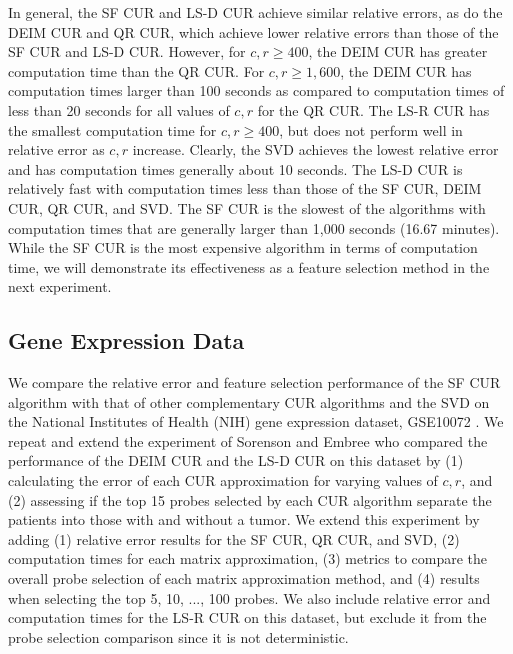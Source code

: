 \documentclass[12pt]{article}
\begin{document}
In general, the SF CUR and LS-D CUR achieve similar relative errors, as do the DEIM CUR and QR CUR, which achieve lower relative errors than those of the SF CUR and LS-D CUR.  However, for $c,r \geq 400$, the DEIM CUR has greater computation time than the QR CUR.  For $c,r \geq 1,600$, the DEIM CUR has computation times larger than 100 seconds as compared to computation times of less than 20 seconds for all values of $c,r$ for the QR CUR.  The LS-R CUR has the smallest computation time for $c,r \geq 400$, but does not perform well in relative error as $c,r$ increase.  Clearly, the SVD achieves the lowest relative error and has computation times generally about 10 seconds.  The LS-D CUR is relatively fast with computation times less than those of the SF CUR, DEIM CUR, QR CUR, and SVD.  The SF CUR is the slowest of the algorithms with computation times that are generally larger than 1,000 seconds (16.67 minutes).  While the SF CUR is the most expensive algorithm in terms of computation time, we will demonstrate its effectiveness as a feature selection method in the next experiment. 

\subsection{Gene Expression Data}
We compare the relative error and feature selection performance of the SF CUR algorithm with that of other complementary CUR algorithms and the SVD on the National Institutes of Health (NIH) gene expression dataset, GSE10072 \cite{data_gene_exp}. We repeat and extend the experiment of Sorenson and Embree \cite{sorenson_embree_2016} who compared the performance of the DEIM CUR and the LS-D CUR on this dataset by (1) calculating the error of each CUR approximation for varying values of $c,r$, and (2) assessing if the top 15 probes selected by each CUR algorithm separate the patients into those with and without a tumor. We extend this experiment by adding (1) relative error results for the SF CUR, QR CUR, and SVD, (2) computation times for each matrix approximation, (3) metrics to compare the overall probe selection of each matrix approximation method, and (4) results when selecting the top 5, 10, ..., 100 probes.  We also include relative error and computation times for the LS-R CUR on this dataset, but exclude it from the probe selection comparison since it is not deterministic. 
\end{document}
